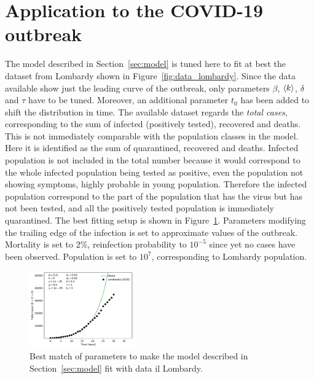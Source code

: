 \section{Application to the COVID-19 outbreak}
\label{sec:covid}

The model described in Section~\ref{sec:model} is tuned here to fit at best the dataset from Lombardy shown in Figure~\ref{fig:data_lombardy}. Since the data available show just the leading curve of the outbreak, only parameters $\beta$, $\braket{k}$, $\delta$ and $\tau$ have to be tuned. Moreover, an additional parameter $t_0$ has been added to shift the distribution in time. The available dataset regards the \emph{total cases}, corresponding to the sum of infected (positively tested), recovered and deaths. This is not immediately comparable with the population classes in the model. Here it is identified as the sum of quarantined, recovered and deaths. Infected population is not included in the total number because it would correspond to the whole infected population being tested as positive, even the population not showing symptoms, highly probable in young population. Therefore the infected population correspond to the part of the population that has the virus but has not been tested, and all the positively tested population is immediately quarantined. The best fitting setup is shown in Figure~\ref{fig:data_vs_model_first_lombardy}. Parameters modifying the trailing edge of the infection is set to approximate values of the outbreak. Mortality is set to $2\%$, reinfection probability to $10^{-5}$ since yet no cases have been observed. Population is set to $10^7$, corresponding to Lombardy population.\\

\begin{figure}
\centering
  \includegraphics[width=0.4\textwidth]{imgs/Covid/DataVsModel_parameters_Lombardia_less_impacting.pdf}
  \caption{Best match of parameters to make the model described in Section~\ref{sec:model} fit with data il Lombardy.}
  \label{fig:data_vs_model_first_lombardy}
\end{figure}

